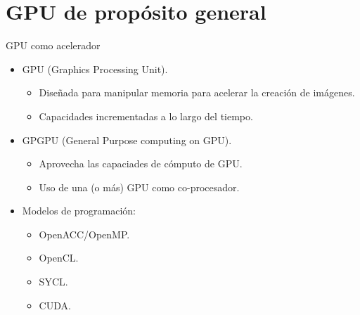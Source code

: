 \section{GPU de propósito general}

\begin{frame}[t]{GPU como acelerador}
\begin{itemize}
  \item GPU (Graphics Processing Unit).
    \begin{itemize}
      \item Diseñada para manipular memoria para acelerar la creación de imágenes.
      \item Capacidades incrementadas a lo largo del tiempo.
    \end{itemize}

  \item GPGPU (General Purpose computing on GPU).
    \begin{itemize}
      \item Aprovecha las capaciades de cómputo de GPU.
      \item Uso de una (o más) GPU como co-procesador.
    \end{itemize}

  \item Modelos de programación:
    \begin{itemize}
      \item OpenACC/OpenMP.
      \item OpenCL.
      \item SYCL.
      \item CUDA.
    \end{itemize}
\end{itemize}
\end{frame}

